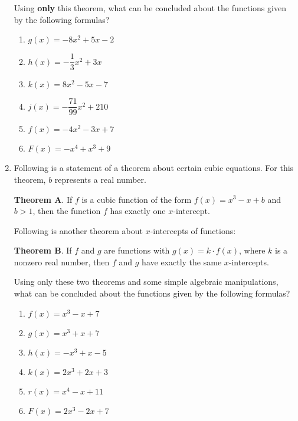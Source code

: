 \begin{enumerate}
Using \textbf{only} this theorem, what can be concluded about the functions given by the following formulas?
\begin{multicols}{2}
\begin{enumerate}
\item $g\left( x \right) =  - 8x^2  + 5x - 2$


\item $h\left( x \right) =  - \dfrac{1}{3}x^2  + 3x$


\item $k\left( x \right) = 8x^2  - 5x - 7$


\item $j\left( x \right) =  - \dfrac{{71}}{{99}}x^2  + 210$


\item $f\left( x \right) =  - 4x^2  - 3x + 7$


\item $F\left( x \right) =  - x^4  + x^3  + 9$
\end{enumerate}
\end{multicols}


\item Following is a statement of a theorem about certain cubic equations.  For this theorem, 
$b$ represents a real number.\label{exer:sec1-1-8}

\textbf{Theorem A}.  If $f$ is a cubic function of the form $f(x) = x^3 - x + b$ and $b > 1$, then the function $f$ has exactly one $x$-intercept.

Following is another theorem about $x$-intercepts of functions:

\textbf{Theorem B}.  If $f$ and $g$ are functions with $g(x) = k \cdot f(x)$, where $k$ is a nonzero real number, then $f$ and $g$ have exactly the same $x$-intercepts.

Using only these two theorems and some simple algebraic manipulations, what can be concluded about the functions given by the following formulas?

\begin{multicols}{2}
\begin{enumerate}
\item $f(x) = x^3 - x + 7$
\item $g(x) = x^3 + x + 7$
\item $h(x) = -x^3 + x - 5$
\item $k(x) = 2x^3 + 2x + 3$
\item $r(x) = x^4 - x + 11$
\item $F(x) = 2x^3 - 2x + 7$
\end{enumerate}
\end{multicols}



\end{enumerate}
